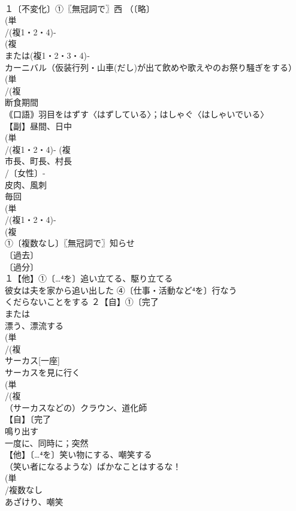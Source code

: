 \documentclass[8pt]{extreport}
\begin{document}
\begin{CJK}{UTF8}{min}
\\	１〔不変化〕①〖無冠詞で〗西 （〔略〕
\\	(単
\\	/(複1・2・4)-
\\	(複
\\	または(複1・2・3・4)‐
\\	カーニバル（仮装行列・山車(だし)が出て飲めや歌えやのお祭り騒ぎをする）
\\	(単
\\	/(複
\\	断食期間 
\\	｟口語｠羽目をはずす〈はずしている〉；はしゃぐ〈はしゃいでいる〉
\\	【副】昼間、日中 
\\	(単
\\	/(複1・2・4)- (複
\\	市長、町長、村長 
\\	/〔女性〕-
\\	皮肉、風刺 
\\	毎回
\\	(単
\\	/(複1・2・4)-
\\	(複
\\	①〔複数なし〕〖無冠詞で〗知らせ
\\	〔過去〕
\\	〔過分〕
\\	１【他】①〔…⁴を〕追い立てる、駆り立てる 
\\	彼女は夫を家から追い出した ④〔仕事・活動など⁴を〕行なう　 
\\	くだらないことをする ２【自】①〔完了
\\	または
\\	漂う、漂流する
\\	(単
\\	/(複
\\	サーカス[一座] 
\\	サーカスを見に行く
\\	(単
\\	/(複
\\	（サーカスなどの）クラウン、道化師 
\\	【自】〔完了
\\	鳴り出す
\\	一度に、同時に；突然
\\	【他】〔…⁴を〕笑い物にする、嘲笑する 
\\	（笑い者になるような）ばかなことはするな！
\\	(単
\\	/複数なし 
\\	あざけり、嘲笑 

\end{CJK}
\end{document}
